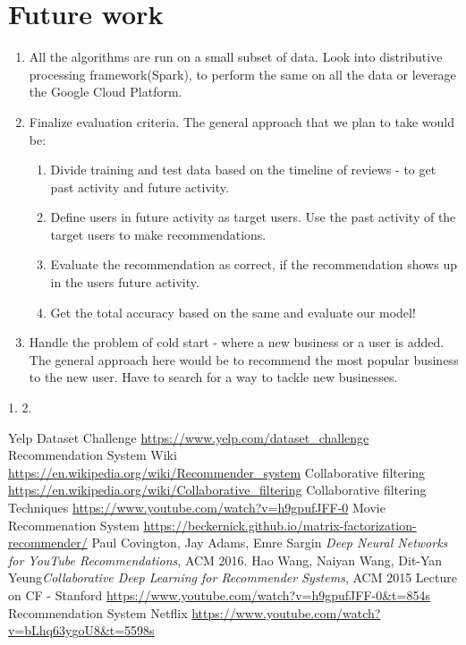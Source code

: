 \documentclass[11pt]{article}
\begin{document}
	
	
	\section{Future work}
	\begin{enumerate}
		\item All the algorithms are run on a small subset of data. Look into distributive processing framework(Spark), to perform the same on all the data or leverage the Google Cloud Platform.
		\item Finalize evaluation criteria. The general approach that we plan to take would be:
		\begin{enumerate}
			\item Divide training and test data based on the timeline of reviews - to get past activity and future activity.
			\item Define users in future activity as target users. Use the past activity of the target users to make recommendations.
			\item Evaluate the recommendation as correct, if the recommendation shows up in the users future activity.
			\item Get the total accuracy based on the same and evaluate our model!
		\end{enumerate}
		\item Handle the problem of cold  start - where a new business or a user is added. The general approach here would be to recommend the most popular business to the new user. Have to search for a way to tackle new businesses.
		
	\end{enumerate}
	1. 
	2. 
	
	
	\begin{thebibliography}{9}
		
	 Yelp Dataset Challenge \url{https://www.yelp.com/dataset_challenge}
	 Recommendation System Wiki \url{https://en.wikipedia.org/wiki/Recommender_system}
	Collaborative filtering \url{https://en.wikipedia.org/wiki/Collaborative_filtering}
		Collaborative filtering Techniques \url{https://www.youtube.com/watch?v=h9gpufJFF-0}
		Movie Recommenation System \url{https://beckernick.github.io/matrix-factorization-recommender/}
	 Paul Covington, Jay Adams, Emre Sargin \textit{Deep Neural Networks for YouTube Recommendations}, ACM 2016.
	 Hao Wang, Naiyan Wang, Dit-Yan Yeung\textit{Collaborative Deep Learning for Recommender Systems}, ACM 2015
	 Lecture on CF - Stanford \url{https://www.youtube.com/watch?v=h9gpufJFF-0&t=854s}
	 Recommendation System Netflix \url{https://www.youtube.com/watch?v=bLhq63ygoU8&t=5598s}
	\end{thebibliography}
	
	
	
	
	
	
\end{document}
